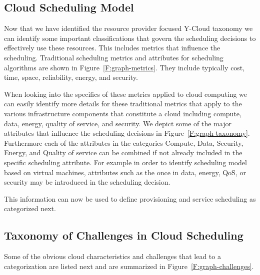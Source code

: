 \documentclass[final,5p,times,twocolumn]{elsarticle}
\begin{document}


\subsection{Cloud Scheduling Model}

Now that we have identified the resource provider focused Y-Cloud
taxonomy we can identify some important classifications that govern the
scheduling decisions to effectively use these resources. This includes
metrics that influence the scheduling. Traditional scheduling metrics
and attributes for scheduling algorithms are shown in
Figure~\ref{F:graph-metrics}. They include typically cost, time, space,
reliability, energy, and security.



When looking into the specifics of these metrics applied to cloud
computing we can easily identify more details for these traditional
metrics that apply to the various infrastructure components that
constitute a cloud including compute, data, energy, quality of
service, and security. We depict some of the major attributes that
influence the scheduling decisions in Figure~\ref{F:graph-taxonomy}.
Furthermore each of the attributes in the categories Compute, Data,
Security, Energy, and Quality of service can be combined if not
already included in the specific scheduling attribute. For example in
order to identify scheduling model based on virtual machines,
attributes such as the once in data, energy, QoS, or security may be
introduced in the scheduling decision.



This information can now be used to define provisioning and service
scheduling as categorized next.

\subsection{Taxonomy of Challenges in Cloud Scheduling}\label{sec:challange}

Some of the obvious cloud characteristics and challenges that lead to
a categorization are listed next and are summarized in
Figure~\ref{F:graph-challenges}.
\end{document}
